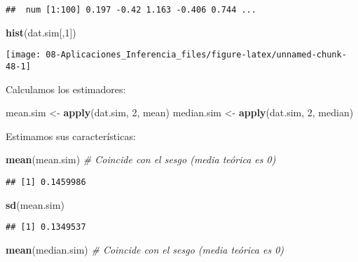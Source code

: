 \documentclass[
]{book}
\newenvironment{Shaded}{\begin{snugshade}}{\end{snugshade}}
\newcommand{\CommentTok}[1]{\textcolor[rgb]{0.56,0.35,0.01}{\textit{#1}}}
\newcommand{\DecValTok}[1]{\textcolor[rgb]{0.00,0.00,0.81}{#1}}
\newcommand{\KeywordTok}[1]{\textcolor[rgb]{0.13,0.29,0.53}{\textbf{#1}}}
\newcommand{\NormalTok}[1]{#1}
\newcommand{\StringTok}[1]{\textcolor[rgb]{0.31,0.60,0.02}{#1}}
\theoremstyle{break}
\theoremstyle{definition}
\theoremstyle{definition}
\theoremstyle{definition}
\theoremstyle{remark}
\begin{document}
\begin{enumerate}
\begin{verbatim}
##  num [1:100] 0.197 -0.42 1.163 -0.406 0.744 ...
\end{verbatim}

\begin{Shaded}
\begin{Highlighting}[]
\KeywordTok{hist}\NormalTok{(dat.sim[,}\DecValTok{1}\NormalTok{])}
\end{Highlighting}
\end{Shaded}

  \begin{center}\texttt{[image: 08-Aplicaciones\_Inferencia\_files/figure-latex/unnamed-chunk-48-1]} \end{center}

  Calculamos los estimadores:

\begin{Shaded}
\begin{Highlighting}[]
\NormalTok{mean.sim <-}\StringTok{ }\KeywordTok{apply}\NormalTok{(dat.sim, }\DecValTok{2}\NormalTok{, mean)}
\NormalTok{median.sim <-}\StringTok{ }\KeywordTok{apply}\NormalTok{(dat.sim, }\DecValTok{2}\NormalTok{, median)}
\end{Highlighting}
\end{Shaded}

  Estimamos sus características:

\begin{Shaded}
\begin{Highlighting}[]
\KeywordTok{mean}\NormalTok{(mean.sim) }\CommentTok{# Coincide con el sesgo (media teórica es 0)}
\end{Highlighting}
\end{Shaded}

\begin{verbatim}
## [1] 0.1459986
\end{verbatim}

\begin{Shaded}
\begin{Highlighting}[]
\KeywordTok{sd}\NormalTok{(mean.sim)}
\end{Highlighting}
\end{Shaded}

\begin{verbatim}
## [1] 0.1349537
\end{verbatim}

\begin{Shaded}
\begin{Highlighting}[]
\KeywordTok{mean}\NormalTok{(median.sim) }\CommentTok{# Coincide con el sesgo (media teórica es 0)}
\end{Highlighting}
\end{Shaded}


\end{enumerate}
\end{document}
